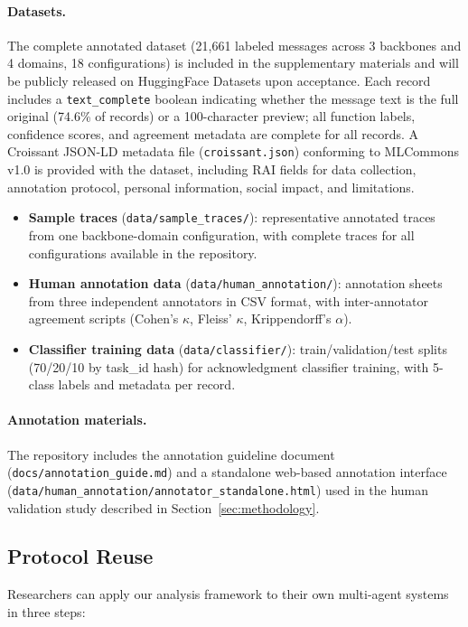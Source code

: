 \paragraph{Datasets.}
The complete annotated dataset (21{,}661 labeled messages across 3 backbones and 4 domains, 18 configurations) is included in the supplementary materials and will be publicly released on HuggingFace Datasets upon acceptance. Each record includes a \texttt{text\_complete} boolean indicating whether the message text is the full original (74.6\% of records) or a 100-character preview; all function labels, confidence scores, and agreement metadata are complete for all records. A Croissant JSON-LD metadata file (\texttt{croissant.json}) conforming to MLCommons v1.0 is provided with the dataset, including RAI fields for data collection, annotation protocol, personal information, social impact, and limitations.
\begin{itemize}[nosep]
  \item \textbf{Sample traces} (\texttt{data/sample\_traces/}): representative annotated traces from one backbone-domain configuration, with complete traces for all configurations available in the repository.
  \item \textbf{Human annotation data} (\texttt{data/human\_annotation/}): annotation sheets from three independent annotators in CSV format, with inter-annotator agreement scripts (Cohen's $\kappa$, Fleiss' $\kappa$, Krippendorff's $\alpha$).
  \item \textbf{Classifier training data} (\texttt{data/classifier/}): train/validation/test splits (70/20/10 by task\_id hash) for acknowledgment classifier training, with 5-class labels and metadata per record.
\end{itemize}

\paragraph{Annotation materials.}
The repository includes the annotation guideline document (\texttt{docs/annotation\_guide.md}) and a standalone web-based annotation interface (\texttt{data/human\_annotation/annotator\_standalone.html}) used in the human validation study described in Section~\ref{sec:methodology}.

\subsection{Protocol Reuse}

Researchers can apply our analysis framework to their own multi-agent systems in three steps:

